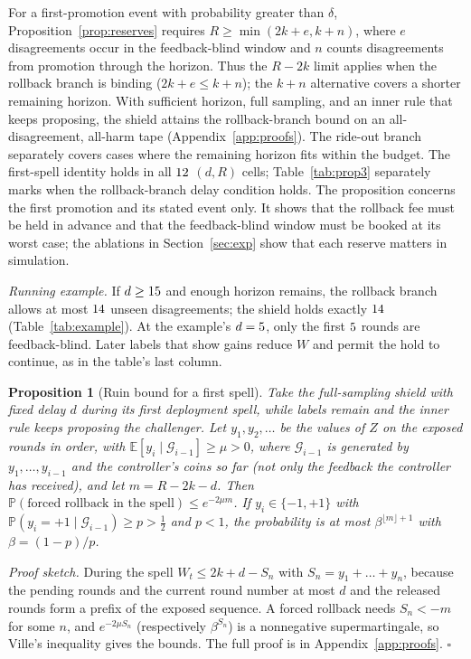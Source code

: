 \documentclass[10pt]{article}
\theoremstyle{plain}
\newtheorem{proposition}{Proposition}
\theoremstyle{definition}
\newcommand{\PP}{\mathbb{P}}
\newcommand{\E}{\mathbb{E}}
\begin{document}
For a first-promotion event with probability greater than $\delta$, Proposition~\ref{prop:reserves} requires $R\ge\min(2k+e,k+n)$, where $e$ disagreements occur in the feedback-blind window and $n$ counts disagreements from promotion through the horizon. Thus the $R-2k$ limit applies when the rollback branch is binding ($2k+e\le k+n$); the $k+n$ alternative covers a shorter remaining horizon. With sufficient horizon, full sampling, and an inner rule that keeps proposing, the shield attains the rollback-branch bound on an all-disagreement, all-harm tape (Appendix~\ref{app:proofs}). The ride-out branch separately covers cases where the remaining horizon fits within the budget. The first-spell identity holds in all $12{}$ $(d,R)$ cells; Table~\ref{tab:prop3} separately marks when the rollback-branch delay condition holds. The proposition concerns the first promotion and its stated event only. It shows that the rollback fee must be held in advance and that the feedback-blind window must be booked at its worst case; the ablations in Section~\ref{sec:exp} show that each reserve matters in simulation.

\emph{Running example.} If $d\ge15$ and enough horizon remains, the rollback branch allows at most $14$ unseen disagreements; the shield holds exactly $14$ (Table~\ref{tab:example}). At the example's $d=5$, only the first $5$ rounds are feedback-blind. Later labels that show gains reduce $W$ and permit the hold to continue, as in the table's last column.

\begin{samepage}
\begin{proposition}[Ruin bound for a first spell]\label{prop:price}
Take the full-sampling shield with fixed delay $d$ during its first deployment spell, while labels remain and the inner rule keeps proposing the challenger. Let $y_1,y_2,\dots$ be the values of $Z$ on the exposed rounds in order, with $\E[y_i\mid\mathcal G_{i-1}]\ge\mu>0$, where $\mathcal G_{i-1}$ is generated by $y_1,\dots,y_{i-1}$ and the controller's coins so far (not only the feedback the controller has received), and let $m=R-2k-d$. Then $\PP(\text{forced rollback in the spell})\le e^{-2\mu m}$. If $y_i\in\{-1,+1\}$ with $\PP(y_i=+1\mid\mathcal G_{i-1})\ge p>\tfrac12$ and $p<1$, the probability is at most $\beta^{\lfloor m\rfloor+1}$ with $\beta=(1-p)/p$.
\end{proposition}
\end{samepage}
\emph{Proof sketch.} During the spell $W_t\le2k+d-S_n$ with $S_n=y_1+\dots+y_n$, because the pending rounds and the current round number at most $d$ and the released rounds form a prefix of the exposed sequence. A forced rollback needs $S_n<-m$ for some $n$, and $e^{-2\mu S_n}$ (respectively $\beta^{S_n}$) is a nonnegative supermartingale, so Ville's inequality gives the bounds. The full proof is in Appendix~\ref{app:proofs}. \hfill$\square$
\end{document}
